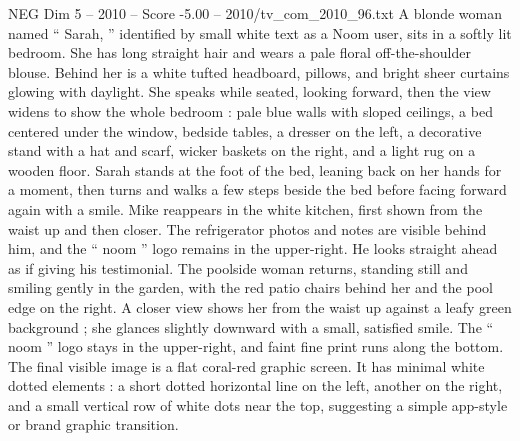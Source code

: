 \begin{textsample}{NEG Dim 5 – 2010 – Score -5.00 – 2010/tv\_com\_2010\_96.txt}
A blonde woman named “ Sarah, ” identified by small white text as a Noom user, sits in a softly lit bedroom.
She has long straight hair and wears a pale floral off-the-shoulder blouse.
Behind her is a white tufted headboard, pillows, and bright sheer curtains glowing with daylight.
She speaks while seated, looking forward, then the view widens to show the whole bedroom : pale blue walls with sloped ceilings, a bed centered under the window, bedside tables, a dresser on the left, a decorative stand with a hat and scarf, wicker baskets on the right, and a light rug on a wooden floor.
Sarah stands at the foot of the bed, leaning back on her hands for a moment, then turns and walks a few steps beside the bed before facing forward again with a smile.
Mike reappears in the white kitchen, first shown from the waist up and then closer.
The refrigerator photos and notes are visible behind him, and the “ noom ” logo remains in the upper-right.
He looks straight ahead as if giving his testimonial.
The poolside woman returns, standing still and smiling gently in the garden, with the red patio chairs behind her and the pool edge on the right.
A closer view shows her from the waist up against a leafy green background ; she glances slightly downward with a small, satisfied smile.
The “ noom ” logo stays in the upper-right, and faint fine print runs along the bottom.
The final visible image is a flat coral-red graphic screen.
It has minimal white dotted elements : a short dotted horizontal line on the left, another on the right, and a small vertical row of white dots near the top, suggesting a simple app-style or brand graphic transition.

\end{textsample}
